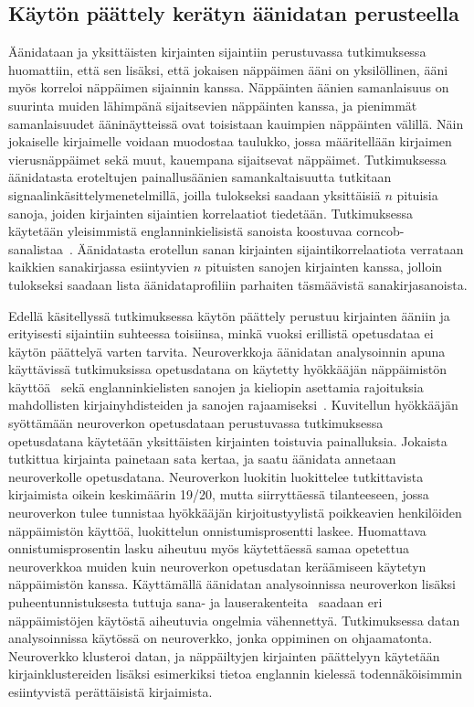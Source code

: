 \documentclass[finnish]{tktltiki2}
\theoremstyle{definition}
\theoremstyle{remark}
\begin{document}
\subsection{Käytön päättely kerätyn äänidatan perusteella}
Äänidataan ja yksittäisten kirjainten sijaintiin perustuvassa tutkimuksessa~\cite{berger} huomattiin, että sen lisäksi, että jokaisen näppäimen ääni on yksilöllinen, ääni myös korreloi näppäimen sijainnin kanssa. Näppäinten äänien samanlaisuus on suurinta muiden lähimpänä sijaitsevien näppäinten kanssa, ja pienimmät samanlaisuudet ääninäytteissä ovat toisistaan kauimpien näppäinten välillä. Näin jokaiselle kirjaimelle voidaan muodostaa taulukko, jossa määritellään kirjaimen vierusnäppäimet sekä muut, kauempana sijaitsevat näppäimet. Tutkimuksessa äänidatasta eroteltujen painallusäänien samankaltaisuutta tutkitaan signaalinkäsittelymenetelmillä, joilla tulokseksi saadaan yksittäisiä $n$ pituisia sanoja, joiden kirjainten sijaintien korrelaatiot tiedetään. Tutkimuksessa käytetään yleisimmistä englanninkielisistä sanoista koostuvaa corncob-sanalistaa~\cite{corn}. Äänidatasta erotellun sanan kirjainten sijaintikorrelaatiota verrataan kaikkien sanakirjassa esiintyvien $n$ pituisten sanojen kirjainten kanssa, jolloin tulokseksi saadaan lista äänidataprofiliin parhaiten täsmäävistä sanakirjasanoista. 

Edellä käsitellyssä tutkimuksessa käytön päättely perustuu kirjainten ääniin ja erityisesti sijaintiin suhteessa toisiinsa, minkä vuoksi erillistä opetusdataa ei käytön päättelyä varten tarvita. Neuroverkkoja äänidatan analysoinnin apuna käyttävissä tutkimuksissa opetusdatana on käytetty hyökkääjän näppäimistön käyttöä~\cite{aso} sekä englanninkielisten sanojen ja kieliopin asettamia rajoituksia mahdollisten kirjainyhdisteiden ja sanojen rajaamiseksi~\cite{zhu}. Kuvitellun hyökkääjän syöttämään neuroverkon opetusdataan perustuvassa tutkimuksessa~\cite{aso} opetusdatana käytetään yksittäisten kirjainten toistuvia painalluksia. Jokaista tutkittua kirjainta painetaan sata kertaa, ja saatu äänidata annetaan neuroverkolle opetusdatana. Neuroverkon luokitin luokittelee tutkittavista kirjaimista oikein keskimäärin 19/20, mutta siirryttäessä tilanteeseen, jossa neuroverkon tulee tunnistaa hyökkääjän kirjoitustyylistä poikkeavien henkilöiden näppäimistön käyttöä, luokittelun onnistumisprosentti laskee. Huomattava onnistumisprosentin lasku aiheutuu myös käytettäessä samaa opetettua neuroverkkoa muiden kuin neuroverkon opetusdatan keräämiseen käytetyn näppäimistön kanssa.
Käyttämällä äänidatan analysoinnissa neuroverkon lisäksi puheentunnistuksesta tuttuja sana- ja lauserakenteita~\cite{zhu} saadaan eri näppäimistöjen käytöstä aiheutuvia ongelmia vähennettyä. Tutkimuksessa datan analysoinnissa käytössä on neuroverkko, jonka oppiminen on ohjaamatonta. Neuroverkko klusteroi datan, ja näppäiltyjen kirjainten päättelyyn käytetään kirjainklustereiden lisäksi esimerkiksi tietoa englannin kielessä todennäköisimmin esiintyvistä perättäisistä kirjaimista.
\end{document}

